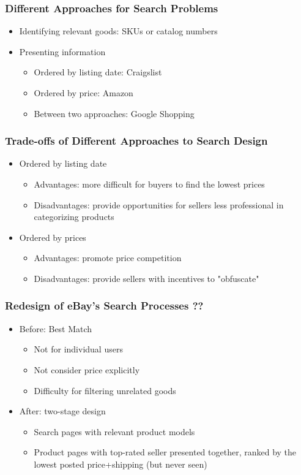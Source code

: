 \documentclass{beamer}
\begin{document}
\begin{frame}
\frametitle{Different Approaches for Search Problems}
\begin{itemize}
\item Identifying relevant goods: SKUs or catalog numbers %
\item Presenting information
  \begin{itemize}
  \item Ordered by listing date: Craigslist %
  \item Ordered by price: Amazon
  \item Between two approaches: Google Shopping
  \end{itemize}
\end{itemize}
\end{frame}

\begin{frame}
\frametitle{Trade-offs of Different Approaches to Search Design}
\begin{itemize}
\item Ordered by listing date
  \begin{itemize}
  \item Advantages: more difficult for buyers to find the lowest prices
  \item Disadvantages: provide opportunities for sellers less professional in categorizing products
  \end{itemize}
\item Ordered by prices
\begin{itemize}
\item Advantages: promote price competition
\item Disadvantages: provide sellers with incentives to "obfuscate"
\end{itemize}
\end{itemize}
\end{frame}

\begin{frame}
\frametitle{Redesign of eBay's Search Processes ??}
\begin{itemize}
\item Before: Best Match
  \begin{itemize}
  \item Not for individual users
  \item Not consider price explicitly %
  \item Difficulty for filtering unrelated goods
  \end{itemize}
\item After: two-stage design
  \begin{itemize}
  \item Search pages with relevant product models
  \item Product pages with top-rated seller presented together, ranked by the lowest posted price+shipping (but never seen)
  \end{itemize}
\end{itemize}
\end{frame}
\end{document}
